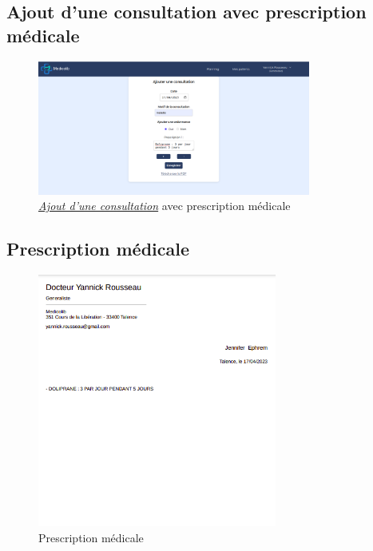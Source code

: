 \documentclass[a4paper]{report}
\begin{document}
\subsection{Ajout d'une consultation avec prescription médicale}
\begin{figure}[H]
    \vspace{-10pt}
    \centering
    \includegraphics[width=0.8\textwidth]{captures/consultation-prescription.png}
    \caption{\textit{\hyperref[consultation]{Ajout d'une consultation}} avec prescription médicale}
    \label{fig:DCU27}
\end{figure}

\subsection{Prescription médicale}
\begin{figure}[H]
    \vspace{-10pt}
    \centering
    \includegraphics[width=0.7\textwidth]{captures/prescription.png}
    \caption{Prescription médicale}
    \label{fig:DCU28}
\end{figure}
\end{document}
